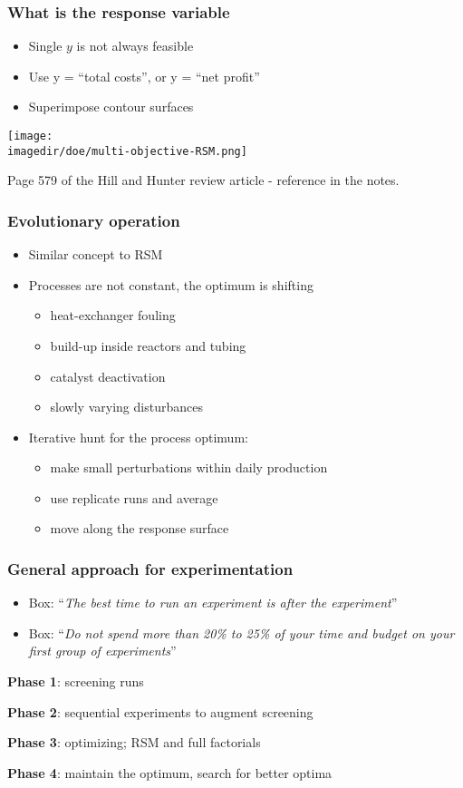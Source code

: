 \begin{frame}\frametitle{What is the response variable}
	\begin{itemize}
		\item	Single $y$ is not always feasible
		\item	Use y = ``total costs'', or y = ``net profit''
		\item	Superimpose contour surfaces
	\end{itemize}
	\begin{center}
		\texttt{[image: \\imagedir/doe/multi-objective-RSM.png]}
	\end{center}
	Page 579 of the Hill and Hunter review article - reference in the notes.
\end{frame}


\begin{frame}\frametitle{Evolutionary operation}
	\begin{itemize}
		\item	Similar concept to RSM
		\item	Processes are not constant, the optimum is shifting
		\begin{itemize}
			\item	heat-exchanger fouling
			\item	build-up inside reactors and tubing
			\item	catalyst deactivation
			\item	slowly varying disturbances
		\end{itemize}
	\end{itemize}
	\begin{itemize}
		\item	Iterative hunt for the process optimum:
		\begin{itemize}
			\item	make small perturbations within daily production
			\item	use replicate runs and average
			\item	move along the response surface
		\end{itemize}
	\end{itemize}
\end{frame}

\begin{frame}\frametitle{General approach for experimentation}
	\begin{itemize}
		\item	Box: ``\emph{The best time to run an experiment is after the experiment}''
		\item	Box: ``\emph{Do not spend more than 20\% to 25\% of your time and budget on your first group of experiments}''
	\end{itemize}

	\textbf{Phase 1}: screening runs

	\textbf{Phase 2}: sequential experiments to augment screening

	\textbf{Phase 3}: optimizing; RSM and full factorials

	\textbf{Phase 4}: maintain the optimum, search for better optima
\end{frame}

